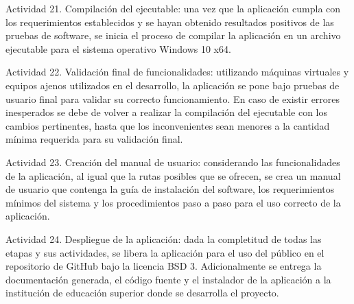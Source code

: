 \begin{APAitemize}
    \item Actividad 21. Compilación del ejecutable: una vez que la aplicación cumpla con los requerimientos establecidos y se hayan obtenido resultados positivos de las pruebas de software, se inicia el proceso de compilar la aplicación en un archivo ejecutable para el sistema operativo Windows 10 x64.
    \item Actividad 22. Validación final de funcionalidades: utilizando máquinas virtuales y equipos ajenos utilizados en el desarrollo, la aplicación se pone bajo pruebas de usuario final para validar su correcto funcionamiento. En caso de existir errores inesperados se debe de volver a realizar la compilación del ejecutable con los cambios pertinentes, hasta que los inconvenientes sean menores a la cantidad mínima requerida para su validación final.
    \item Actividad 23. Creación del manual de usuario: considerando las funcionalidades de la aplicación, al igual que la rutas posibles que se ofrecen, se crea un manual de usuario que contenga la guía de instalación del software, los requerimientos mínimos del sistema y los procedimientos paso a paso para el uso correcto de la aplicación.
    \item Actividad 24. Despliegue de la aplicación: dada la completitud de todas las etapas y sus actividades, se libera la aplicación para el uso del público en el repositorio de GitHub bajo la licencia BSD 3. Adicionalmente se entrega la documentación generada, el código fuente y el instalador de la aplicación a la institución de educación superior donde se desarrolla el proyecto.
\end{APAitemize}


